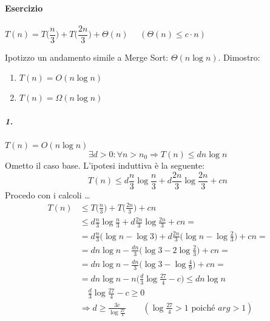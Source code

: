 \paragraph{Esercizio} $T(n) = T\big(\dfrac{n}{3} \big) + T\big(\dfrac{2n}{3} \big) + \Theta (n)$
$\quad (\Theta (n) \leq c \cdot n)$\par
Ipotizzo un andamento simile a Merge Sort: $\Theta (n \log n)$. Dimostro:  
\begin{enumerate}
	\item $T(n) = O(n \log n)$
	\item $T(n) = \Omega (n \log n)$
\end{enumerate}

\subparagraph{1.} $T(n) = O(n \log n)$
$$\exists d > 0 : \forall n > n_0 \Rightarrow T(n) \leq dn \log n$$
Ometto il caso base. L'ipotesi induttiva è la seguente:
\[ 
	T(n) \leq d \frac{n}{3} \log \frac{n}{3} + d \frac{2n}{3} \log \frac{2n}{3} + cn
\]
Procedo con i calcoli \dots
\begin{align*}
	T(n) & \leq T\Big(\frac{n}{3} \Big) + T\Big(\frac{2n}{3} \Big) + cn \\
	& \leq d \frac{n}{3} \log \frac{n}{3} + d \frac{2n}{3} \log \frac{2n}{3} + cn = \\
	& = d \frac{n}{3} \Big(\log n - \log 3 \Big) + d \frac{2n}{3} \Big(\log n - \log \frac{2}{3} \Big) + cn = \\
	& = dn \log n - \frac{dn}{3} \Big( \log 3 - 2 \log \frac{2}{3} \Big) + cn = \\
	& = dn \log n - \frac{dn}{3} \Big( \log 3 - \log \frac{4}{9} \Big) + cn = \\
	& = dn \log n - n \Big( \frac{d}{3} \log \frac{27}{4} - c \Big) \leq dn \log n\\
	& \quad \frac{d}{3} \log \frac{27}{4} - c \geq 0 \\
	& \Rightarrow d \geq \frac{3c}{\log \frac{27}{4}} \qquad (\log \frac{27}{4} > 1 \text{ poiché } arg > 1)
\end{align*}


